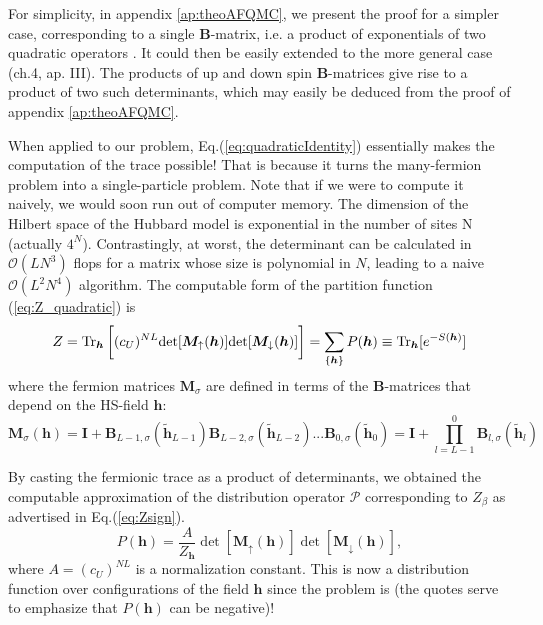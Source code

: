 For simplicity, in appendix \ref{ap:theoAFQMC}, we present the proof for a simpler case, corresponding to a single $\bm B$-matrix, i.e. a product of exponentials of two quadratic operators \cite{hirsch_two-dimensional_1985}.
It could then be easily extended to the more general case \cite{hanke_electronic_nodate}(ch.4, ap. III).
The products of up and down spin $\bm B$-matrices give rise to a product of two such determinants, which may easily be deduced from the proof of appendix \ref{ap:theoAFQMC}.

When applied to our problem, Eq.(\ref{eq:quadraticIdentity}) essentially makes the computation of the trace possible!
That is because it turns the many-fermion problem into a single-particle problem.
Note that if we were to compute it naively, we would soon run out of computer memory.
The dimension of the Hilbert space of the Hubbard model is exponential in the number of sites N (actually $4^N$).
Contrastingly, at worst, the determinant can be calculated in $\mathcal{O}(LN^3)$ flops for a matrix whose size is polynomial in $N$, leading to a naive $\mathcal{O}(L^2 N^4)$ algorithm.
The computable form of the partition function (\ref{eq:Z_quadratic}) is
\begin{equation}\label{eq:effectiveDensityMatrix}
Z =  \operatorname{Tr}_{\bm h} \bigg[ (c_U)^{NL} \text{det} [ \bm M_\uparrow (\bm h)] \text{det} [  \bm M_\downarrow (\bm h) ] \bigg] = \sum_{\{ \bm h \} } P ( \bm h ) \equiv \operatorname{Tr}_{\bm h} [ e^{-S(\bm h) } ]
\end{equation}
where the fermion matrices $\bm M_\sigma$ are defined in terms of the $\bm B$-matrices that depend on the HS-field $\bm h$:
\begin{equation}
\bm M_\sigma (\bm h) = \bm I + \bm B_{L-1,\sigma} ( \widetilde{\bm h}_{L-1}) \bm B_{L-2,\sigma} ( \widetilde{\bm h}_{L-2}) ... \bm B_{0,\sigma} ( \widetilde{\bm h}_0) = \bm I + \prod_{l= L -1}^0 \bm B_{l,\sigma} ( \widetilde{\bm h}_l )
\end{equation}

By casting the fermionic trace as a product of determinants, we obtained the computable approximation of the distribution operator $\mathcal{P}$ corresponding to $Z_{\beta}$ as advertised in Eq.(\ref{eq:Zsign}).
\begin{equation}
P(\bm h) = \frac{A}{Z_{\bm h}} \det [ \bm M_{\uparrow}(\bm h) ] \det [ \bm M_{\downarrow}(\bm h) ] ,
\end{equation}
where $A = (c_U)^{NL}$ is a normalization constant.
This is now a distribution function over configurations of the field $\bm h$ since the problem is  (the quotes serve to emphasize that $P (\bm h )$ can be negative)!

